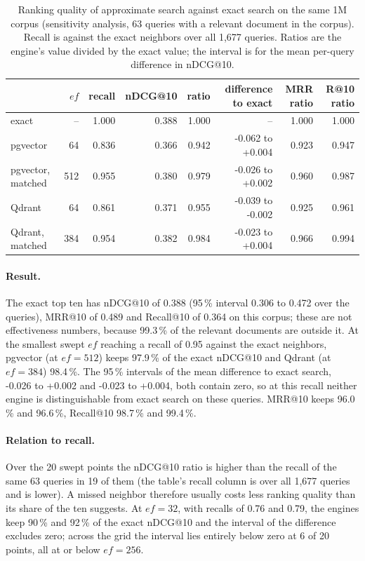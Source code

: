 \documentclass[sigconf, nonacm]{acmart}
\begin{document}
\begin{table}[t]
  \caption{Ranking quality of approximate search against exact search on the same 1M corpus (sensitivity analysis,
  63 queries with a relevant document in the corpus). Recall is against the exact neighbors over all 1{,}677 queries.
  Ratios are the engine's value divided by the exact value; the interval is for the mean per-query difference in nDCG@10.}
  \label{tab:ranking}
  \small
  \begin{tabular}{@{}lrrrrrrr@{}}
    \toprule
    & $ef$ & recall & nDCG@10 & ratio & difference to exact & MRR ratio & R@10 ratio \\
    \midrule
    exact & -- & 1.000 & 0.388 & 1.000 & -- & 1.000 & 1.000 \\
    pgvector & 64 & 0.836 & 0.366 & 0.942 & -0.062 to +0.004 & 0.923 & 0.947 \\
    pgvector, matched & 512 & 0.955 & 0.380 & 0.979 & -0.026 to +0.002 & 0.960 & 0.987 \\
    Qdrant & 64 & 0.861 & 0.371 & 0.955 & -0.039 to -0.002 & 0.925 & 0.961 \\
    Qdrant, matched & 384 & 0.954 & 0.382 & 0.984 & -0.023 to +0.004 & 0.966 & 0.994 \\
    \bottomrule
  \end{tabular}
\end{table}

\paragraph{Result.} The exact top ten has nDCG@10 of 0.388 (95\,\% interval 0.306 to 0.472 over the queries), MRR@10 of 0.489 and
Recall@10 of 0.364 on this corpus; these are not effectiveness numbers, because 99.3\,\% of the relevant documents are
outside it.
At the smallest swept $ef$ reaching a recall of 0.95 against the exact neighbors, pgvector (at $ef=512$) keeps 97.9\,\% of
the exact nDCG@10 and Qdrant (at $ef=384$) 98.4\,\%. The 95\,\% intervals of the mean difference to exact search, -0.026 to +0.002 and -0.023 to +0.004, both contain
zero, so at this recall neither engine is distinguishable from exact search on these queries. MRR@10 keeps 96.0\,\% and
96.6\,\%, Recall@10 98.7\,\% and 99.4\,\%.

\paragraph{Relation to recall.} Over the 20 swept points the nDCG@10 ratio is higher than the recall of the same 63 queries in 19 of them (the
table's recall column is over all 1{,}677 queries and is lower). A missed neighbor therefore usually costs less ranking
quality than its share of the ten suggests. At $ef=32$, with recalls of 0.76 and 0.79, the engines keep 90\,\% and 92\,\% of the exact nDCG@10 and the interval of the
difference excludes zero; across the grid the interval lies entirely below zero at 6 of 20 points, all at or below $ef=256$.
\end{document}
